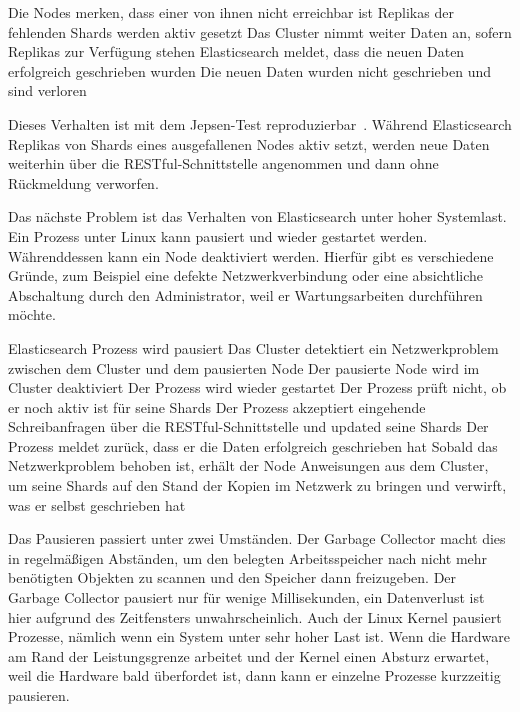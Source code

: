 \begin{outline}
  \1 Die Nodes merken, dass einer von ihnen nicht erreichbar ist
  \1 Replikas der fehlenden Shards werden aktiv gesetzt
  \1 Das Cluster nimmt weiter Daten an, sofern Replikas zur Verfügung stehen
  \1 Elasticsearch meldet, dass die neuen Daten erfolgreich geschrieben wurden
  \1 Die neuen Daten wurden nicht geschrieben und sind verloren
\end{outline}

Dieses Verhalten ist mit dem Jepsen-Test reproduzierbar~\cite{es_jepsen_iso}.
Während Elasticsearch Replikas von Shards eines ausgefallenen Nodes aktiv setzt,
werden neue Daten weiterhin über die RESTful-Schnittstelle angenommen und dann
ohne Rückmeldung verworfen.

Das nächste Problem ist das Verhalten von Elasticsearch unter hoher Systemlast.
Ein Prozess unter Linux kann pausiert und wieder gestartet werden.
Währenddessen kann ein Node deaktiviert werden. Hierfür gibt es verschiedene
Gründe, zum Beispiel eine defekte Netzwerkverbindung oder eine absichtliche
Abschaltung durch den Administrator, weil er Wartungsarbeiten durchführen
möchte.

\begin{outline}
  \1 Elasticsearch Prozess wird pausiert
  \1 Das Cluster detektiert ein Netzwerkproblem zwischen dem Cluster und dem
  pausierten Node
  \1 Der pausierte Node wird im Cluster deaktiviert
  \1 Der Prozess wird wieder gestartet
  \1 Der Prozess prüft nicht, ob er noch aktiv ist für seine Shards
  \1 Der Prozess akzeptiert eingehende Schreibanfragen über die
  RESTful-Schnittstelle und updated seine Shards
  \1 Der Prozess meldet zurück, dass er die Daten erfolgreich geschrieben hat
  \1 Sobald das Netzwerkproblem behoben ist, erhält der Node Anweisungen aus
  dem Cluster, um seine Shards auf den Stand der Kopien im Netzwerk zu bringen
  und verwirft, was er selbst geschrieben hat
\end{outline}

Das Pausieren passiert unter zwei Umständen. Der \gls{Garbage Collector} macht
dies in regelmäßigen Abständen, um den belegten Arbeitsspeicher nach nicht mehr
benötigten Objekten zu scannen und den Speicher dann freizugeben. Der Garbage
Collector pausiert nur für wenige Millisekunden, ein Datenverlust ist hier
aufgrund des Zeitfensters unwahrscheinlich. Auch der Linux Kernel pausiert
Prozesse, nämlich wenn ein System unter sehr hoher Last ist. Wenn die Hardware
am Rand der Leistungsgrenze arbeitet und der Kernel einen Absturz erwartet,
weil die Hardware bald überfordet ist, dann kann er einzelne Prozesse
kurzzeitig pausieren.

